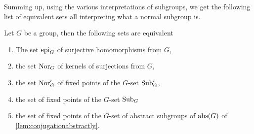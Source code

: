 Summing up, using the various interpretations of subgroups, we get the following list of equivalent sets all interpreting what a normal subgroup is.  
\begin{lemma}
  \label{lem:characterizations of normal}
  Let $G$ be a group, then the following sets are equivalent
\begin{enumerate}
\item The set $\mathrm{epi}_G$ of surjective homomorphisms from $G$,
\item the set $\mathrm{Nor}_G$ of kernels of surjections from $G$,
\item the set $\mathrm{Nor}_G'$ of fixed points of the $G$-set $\mathrm{Sub}_G'$,
\item the set of fixed points of the $G$-set $\mathrm{Sub}_G$
\item the set of fixed points of the $G$-set of abstract subgroups of $\mathrm{abs}(G)$ of \cref{lem:conjugationabstractly}.
\end{enumerate}
\end{lemma}





